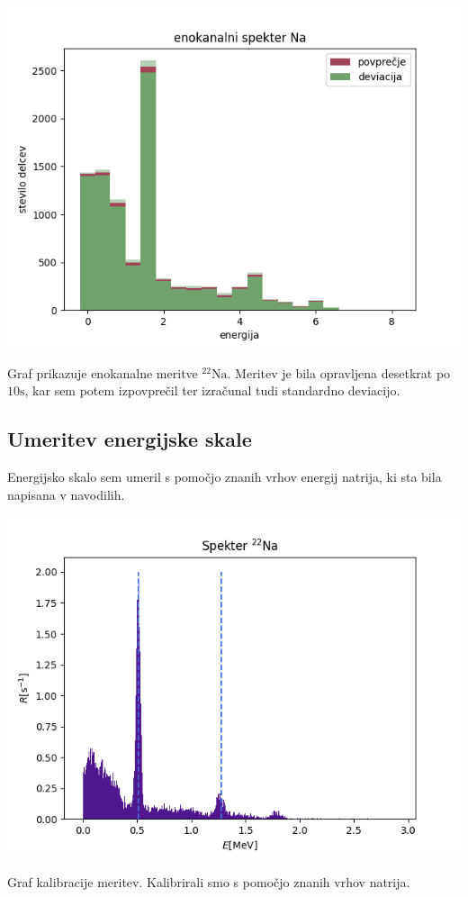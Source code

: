 \documentclass[11pt]{article}
\begin{document}
\begin{slika}[H]
\begin{center}
\includegraphics[width=.9\linewidth]{figures/enokanalni_na.png}
\caption{\small Graf prikazuje enokanalne meritve $^{22} \mathrm{Na}$. Meritev je bila opravljena desetkrat po $10 \mathrm{s}$, kar sem potem izpovprečil ter izračunal tudi standardno deviacijo. } \label{fig:eno}
\end{center}
\end{slika}

\subsection{Umeritev energijske skale}\label{sec:orgb47b656}

Energijsko skalo sem umeril s pomočjo znanih vrhov energij natrija, ki sta bila napisana v navodilih.

\begin{slika}[H]
\begin{center}
\includegraphics[width=.9\linewidth]{figures/kalibracija.png}
\caption{\small Graf kalibracije meritev. Kalibrirali smo s pomočjo znanih vrhov natrija. }
\end{center}
\end{slika}
\end{document}
